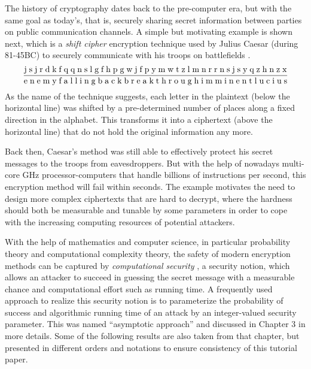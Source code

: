 \documentclass[../main.tex]{subfiles}
\begin{document}
\label{sec:crypto}

The history of cryptography dates back to the pre-computer era, but with the same goal as today's, that is, securely sharing secret information between parties on public communication channels. A simple but motivating example is shown next, which is a \textit{shift cipher} encryption technique used by Julius Caesar (during 81-45BC) to securely communicate with his troops on battlefields \cite{hoffstein2008introduction}.
\begin{align*}
	\frac{\text{j\;s\;j\;r\;d\;k\;f\;q\;q\;n\;s\;l\;g\;f\;h\;p\;g\;w\;j\;f\;p\;y\;m\;w\;t\;z\;l\;m\;n\;r\;r\;n\;s\;j\;s\;y\;q\;z\;h\;n\;z\;x}}{\text{e\;n\;e\;m\;y\;f\;a\;l\;l\;i\;n\;g\;b\;a\;c\;k\;b\;r\;e\;a\;k\;t\;h\;r\;o\;u\;g\;h\;i\;m\;m\;i\;n\;e\;n\;t\;l\;u\;c\;i\;u\;s}}
\end{align*}  	
As the name of the technique suggests, each letter in the plaintext (below the horizontal line) was shifted by a pre-determined number of places along a fixed direction in the alphabet. This transforms it into a ciphertext (above the horizontal line) that do not hold the original information any more. 

Back then, Caesar's method was still able to effectively protect his secret messages to the troops from eavesdroppers. But with the help of nowadays multi-core GHz processor-computers that handle billions of instructions per second, this encryption method will fail within seconds. The example motivates the need to design more complex ciphertexts that are hard to decrypt, where the hardness should both be measurable and tunable by some parameters in order to cope with the increasing computing resources of potential attackers.

With the help of mathematics and computer science, in particular probability theory and computational complexity theory, the safety of modern encryption methods can be captured by \textit{computational security} , a security notion, which allows an attacker to succeed in guessing the secret message with a measurable chance and computational effort such as running time. A frequently used approach to realize this security notion is to parameterize the probability of success and algorithmic running time of an attack by an integer-valued security parameter. This was named ``asymptotic approach'' and discussed in Chapter 3 \cite{katz2014introduction} in more details. Some of the following results are also taken from that chapter, but presented in different orders and notations to ensure consistency of this tutorial paper.  
\end{document}
